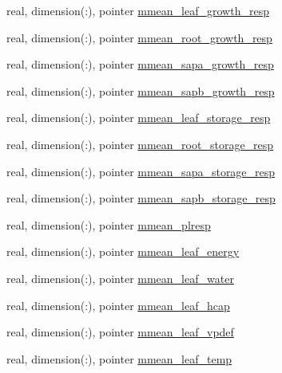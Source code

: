 \begin{DoxyCompactItemize}
\item 
real, dimension(\+:), pointer \hyperlink{structed__state__vars_1_1edtype_a39fe20a672469b3ca5e68b4fff625b53}{mmean\+\_\+leaf\+\_\+growth\+\_\+resp}
\item 
real, dimension(\+:), pointer \hyperlink{structed__state__vars_1_1edtype_a94a5006d915c3d49d2c0b362ac9250d9}{mmean\+\_\+root\+\_\+growth\+\_\+resp}
\item 
real, dimension(\+:), pointer \hyperlink{structed__state__vars_1_1edtype_a4f0f149f02e0c102c7ba80f5d64a11f8}{mmean\+\_\+sapa\+\_\+growth\+\_\+resp}
\item 
real, dimension(\+:), pointer \hyperlink{structed__state__vars_1_1edtype_ae64247c34a1b8309fba97fa6f174d8bd}{mmean\+\_\+sapb\+\_\+growth\+\_\+resp}
\item 
real, dimension(\+:), pointer \hyperlink{structed__state__vars_1_1edtype_a88a3cb5dbf85e1d61da90d49d25857ee}{mmean\+\_\+leaf\+\_\+storage\+\_\+resp}
\item 
real, dimension(\+:), pointer \hyperlink{structed__state__vars_1_1edtype_adee80817146942be0185b4237329cccf}{mmean\+\_\+root\+\_\+storage\+\_\+resp}
\item 
real, dimension(\+:), pointer \hyperlink{structed__state__vars_1_1edtype_aa30442808e0c8e6ee20861a10814c88f}{mmean\+\_\+sapa\+\_\+storage\+\_\+resp}
\item 
real, dimension(\+:), pointer \hyperlink{structed__state__vars_1_1edtype_abadf29b83feccd6feae208784eb2fe5c}{mmean\+\_\+sapb\+\_\+storage\+\_\+resp}
\item 
real, dimension(\+:), pointer \hyperlink{structed__state__vars_1_1edtype_aa1e5c9d16628de5640b1c6259989b415}{mmean\+\_\+plresp}
\item 
real, dimension(\+:), pointer \hyperlink{structed__state__vars_1_1edtype_a59d46ec40d1669adc32d660d9dc39140}{mmean\+\_\+leaf\+\_\+energy}
\item 
real, dimension(\+:), pointer \hyperlink{structed__state__vars_1_1edtype_aabe6b593e9f4ceb9c89ba082f3a0d64f}{mmean\+\_\+leaf\+\_\+water}
\item 
real, dimension(\+:), pointer \hyperlink{structed__state__vars_1_1edtype_a6f2f4e44c3a6e70726d7a7ac6b942fdf}{mmean\+\_\+leaf\+\_\+hcap}
\item 
real, dimension(\+:), pointer \hyperlink{structed__state__vars_1_1edtype_a5d5a68df31514391f5e668dbf87b4ec5}{mmean\+\_\+leaf\+\_\+vpdef}
\item 
real, dimension(\+:), pointer \hyperlink{structed__state__vars_1_1edtype_af54e5f2825ab8ab25132a0f1844e703e}{mmean\+\_\+leaf\+\_\+temp}

\end{DoxyCompactItemize}
